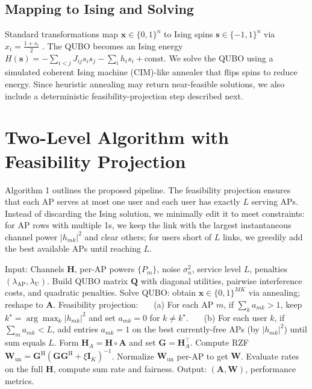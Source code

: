 \subsection{Mapping to Ising and Solving}
Standard transformations map $\mathbf{x}\in\{0,1\}^n$ to Ising spins $\mathbf{s}\in\{-1,1\}^n$ via $x_i=\frac{1+s_i}{2}$ \cite{lucas2014ising,glover2018tutorial}. The QUBO becomes an Ising energy $H(\mathbf{s})=-\sum_{i<j}J_{ij}s_is_j-\sum_i h_i s_i+\text{const}$. We solve the QUBO using a simulated coherent Ising machine (CIM)-like annealer that flips spins to reduce energy. Since heuristic annealing may return near-feasible solutions, we also include a deterministic feasibility-projection step described next.

\section{Two-Level Algorithm with Feasibility Projection}
Algorithm 1 outlines the proposed pipeline. The feasibility projection ensures that each AP serves at most one user and each user has exactly $L$ serving APs. Instead of discarding the Ising solution, we minimally edit it to meet constraints: for AP rows with multiple 1s, we keep the link with the largest instantaneous channel power $|h_{mk}|^2$ and clear others; for users short of $L$ links, we greedily add the best available APs until reaching $L$.

\begin{algorithm}[htbp]
\caption{Two-Level QUBO-RZF with Feasibility Projection}
\begin{algorithmic}[1]
\State Input: Channels $\mathbf{H}$, per-AP powers $\{P_m\}$, noise $\sigma_n^2$, service level $L$, penalties $(\lambda_{\text{AP}},\lambda_{\text{U}})$.
\State Build QUBO matrix $\mathbf{Q}$ with diagonal utilities, pairwise interference costs, and quadratic penalties.
\State Solve QUBO: obtain $\mathbf{x}\in\{0,1\}^{MK}$ via annealing; reshape to $\mathbf{A}$.
\State Feasibility projection:
\State ~~~(a) For each AP $m$, if $\sum_k a_{mk}>1$, keep $k^\star=\arg\max_k |h_{mk}|^2$ and set $a_{mk}=0$ for $k\neq k^\star$.
\State ~~~(b) For each user $k$, if $\sum_m a_{mk}<L$, add entries $a_{mk}=1$ on the best currently-free APs (by $|h_{mk}|^2$) until sum equals $L$.
\State Form $\mathbf{H}_A=\mathbf{H}\circ \mathbf{A}$ and set $\mathbf{G}=\mathbf{H}_A^\top$.
\State Compute RZF $\mathbf{W}_{\mathrm{un}}=\mathbf{G}^\mathrm{H}(\mathbf{G}\mathbf{G}^\mathrm{H}+\xi \mathbf{I}_K)^{-1}$.
\State Normalize $\mathbf{W}_{\mathrm{un}}$ per-AP to get $\mathbf{W}$.
\State Evaluate rates on the full $\mathbf{H}$, compute sum rate and fairness.
\State Output: $(\mathbf{A},\mathbf{W})$, performance metrics.
\end{algorithmic}
\end{algorithm}

